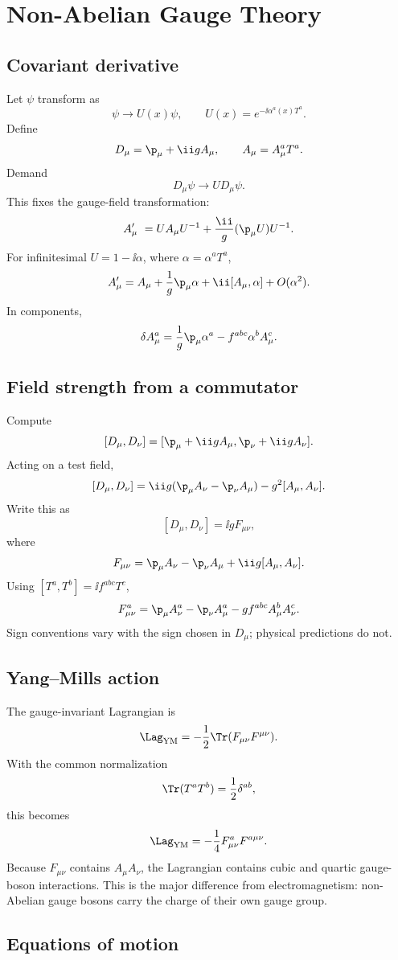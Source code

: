 \chapter{Non-Abelian Gauge Theory}

\section{Covariant derivative}

Let \(\psi\) transform as
\[
  \psi\to U(x)\psi,
  \qquad
  U(x)=e^{-\ii\alpha^a(x)T^a}.
\]
Define
\[
  D_\mu=\p_\mu+\ii g A_\mu,
  \qquad
  A_\mu=A_\mu^aT^a.
\]
Demand
\[
  D_\mu\psi\to U D_\mu\psi.
\]
This fixes the gauge-field transformation:
\[
  A_\mu'\ =
  U A_\mu U^{-1}
  +\frac{\ii}{g}(\p_\mu U)U^{-1}.
\]
For infinitesimal \(U=1-\ii\alpha\), where \(\alpha=\alpha^aT^a\),
\[
  A_\mu'=A_\mu+\frac1g\p_\mu\alpha+\ii[A_\mu,\alpha]+O(\alpha^2).
\]
In components,
\[
  \delta A_\mu^a=\frac1g\p_\mu\alpha^a-f^{abc}\alpha^bA_\mu^c.
\]

\section{Field strength from a commutator}

Compute
\[
  [D_\mu,D_\nu]
  =
  [\p_\mu+\ii gA_\mu,\p_\nu+\ii gA_\nu].
\]
Acting on a test field,
\[
  [D_\mu,D_\nu]
  =
  \ii g(\p_\mu A_\nu-\p_\nu A_\mu)
  -g^2[A_\mu,A_\nu].
\]
Write this as
\[
  [D_\mu,D_\nu]=\ii g F_{\mu\nu},
\]
where
\[
  F_{\mu\nu}
  =
  \p_\mu A_\nu-\p_\nu A_\mu+\ii g[A_\mu,A_\nu].
\]
Using \([T^a,T^b]=\ii f^{abc}T^c\),
\[
  F_{\mu\nu}^a
  =
  \p_\mu A_\nu^a-\p_\nu A_\mu^a
  -g f^{abc}A_\mu^bA_\nu^c.
\]
Sign conventions vary with the sign chosen in \(D_\mu\); physical predictions do not.

\section{Yang--Mills action}

The gauge-invariant Lagrangian is
\[
  \Lag_{\text{YM}}=-\frac12\Tr(F_{\mu\nu}F^{\mu\nu}).
\]
With the common normalization
\[
  \Tr(T^aT^b)=\frac12\delta^{ab},
\]
this becomes
\[
  \Lag_{\text{YM}}=-\frac14F_{\mu\nu}^aF^{a\mu\nu}.
\]
Because \(F_{\mu\nu}\) contains \(A_\mu A_\nu\), the Lagrangian contains cubic and quartic gauge-boson interactions.  This is the major difference from electromagnetism: non-Abelian gauge bosons carry the charge of their own gauge group.

\section{Equations of motion}

